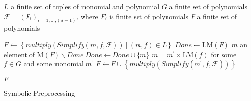 \begin{algorithm}[ht]
  \begin{algorithmic}[1]
    \Require
      \Statex $L$ a finite set of tuples of monomial and polynomial
      \Statex $G$ a finite set of polynomials
      \Statex $\mathcal{F} = (F_i)_{i=1,\ldots,(d-1)}$, where $F_i$ is finite set of polynomials
    \Ensure
      \Statex $F$ a finite set of polynomials
      \Statex

    \State $F \gets \left\{multiply(Simplify(m, f, \mathcal{F}))\ |\ (m, f)\in L\right\}$
    \State $Done \gets \textrm{LM}(F)$
      \State $m$ an element of $\textrm{M}(F)\backslash Done$
      \State $Done \gets Done \cup \{m\}$
        \State $m = m^\prime \times \textrm{LM}(f)$ for some $f \in G$ and some monomial $m^\prime$
        \State $F \gets F \cup \left\{multiply(Simplify(m^\prime, f, \mathcal{F}))\right\}$
      \EndIf
    \EndWhile

    \State \Return $F$

  \end{algorithmic}
  \caption{Symbolic Preprocessing}
  \label{alg:symbolicPreprocessing}
\end{algorithm}

